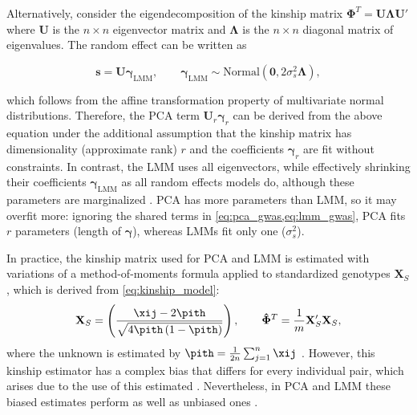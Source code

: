 \documentclass[11pt]{article}
\begin{document}
\begin{linenumbers}
Alternatively, consider the eigendecomposition of the kinship matrix $\mathbf{\Phi}^T = \mathbf{U} \mathbf{\Lambda} \mathbf{U}'$ where $\mathbf{U}$ is the $n \times n$ eigenvector matrix and $\mathbf{\Lambda}$ is the $n \times n$ diagonal matrix of eigenvalues.
The random effect can be written as
\begin{linenomath*}
$$
\mathbf{s} = \mathbf{U} \boldsymbol{\gamma}_\text{LMM},
\quad\quad
\boldsymbol{\gamma}_\text{LMM}
\sim \text{Normal}( \mathbf{0}, 2 \sigma_s^2 \boldsymbol{\Lambda})
,
$$
\end{linenomath*}
which follows from the affine transformation property of multivariate normal distributions.
Therefore, the PCA term $\mathbf{U}_r \boldsymbol{\gamma}_r$ can be derived from the above equation under the additional assumption that the kinship matrix has dimensionality (approximate rank) $r$ and the coefficients $\boldsymbol{\gamma}_r$ are fit without constraints.
In contrast, the LMM uses all eigenvectors, while effectively shrinking their coefficients $\boldsymbol{\gamma}_\text{LMM}$ as all random effects models do, although these parameters are marginalized \citep{astle_population_2009, janss_inferences_2012, hoffman_correcting_2013, zhang_principal_2015}.
PCA has more parameters than LMM, so it may overfit more: ignoring the shared terms in \cref{eq:pca_gwas,eq:lmm_gwas}, PCA fits $r$ parameters (length of $\boldsymbol{\gamma}$), whereas LMMs fit only one ($\sigma^2_s$).

In practice, the kinship matrix used for PCA and LMM is estimated with variations of a method-of-moments formula applied to standardized genotypes $\mathbf{X}_S$, which is derived from \cref{eq:kinship_model}:
\begin{equation}
  \label{eq:kinship_std}
  \mathbf{X}_S
  =
  \left(
    \frac{
      \xij - 2 \pith
    }{
      \sqrt{4 \pith \left( 1 - \pith \right)}
    }
  \right)
  ,
  \quad\quad
  \mathbf{\hat{\Phi}}^T
  =
  \frac{1}{m}
  \mathbf{X}_S'
  \mathbf{X}_S
  ,
\end{equation}
where the unknown \pit is estimated by
$
\pith = \frac{1}{2n} \sum_{j = 1}^n \xij
$
\citep{price_principal_2006, kang_efficient_2008, kang_variance_2010, yang_gcta:_2011, zhou_genome-wide_2012, yang_advantages_2014, loh_efficient_2015, sul_population_2018, zhou_efficiently_2018}.
However, this kinship estimator has a complex bias that differs for every individual pair, which arises due to the use of this estimated \pith \citep{ochoa_estimating_2021, ochoa_new_2019}.
Nevertheless, in PCA and LMM these biased estimates perform as well as unbiased ones \citep{hou_genetic_2023}.


\end{linenumbers}
\end{document}
